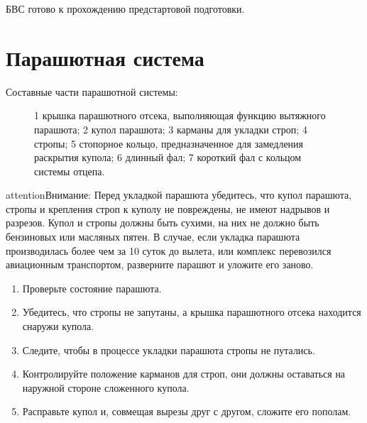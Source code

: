 \documentclass[a4paper,10pt,russian,openany]{sphinxmanual}
\let\sphinxpxdimen\pdfpxdimen\else\newdimen\sphinxpxdimen
\begin{document}
БВС готово к прохождению предстартовой подготовки.


\section{Парашютная система}
\label{\detokenize{uav:id4}}
Составные части парашютной системы:

\begin{figure}[H]
\centering
\capstart

\noindent\sphinxincludegraphics[width=350\sphinxpxdimen]{{para1}.png}
\caption{1 \textendash{} крышка парашютного отсека, выполняющая функцию вытяжного парашюта;
2 \textendash{} купол парашюта;
3 \textendash{} карманы для укладки строп;
4 \textendash{} стропы;
5 \textendash{} стопорное кольцо, предназначенное для замедления раскрытия купола;
6 \textendash{} длинный фал;
7 \textendash{} короткий фал с кольцом системы отцепа.}\label{\detokenize{uav:id13}}\end{figure}

\begin{sphinxadmonition}{attention}{Внимание:}
Перед укладкой парашюта убедитесь, что купол парашюта, стропы и крепления строп к куполу не повреждены, не имеют надрывов и разрезов. Купол и стропы должны быть сухими, на них не должно быть бензиновых или масляных пятен. В случае, если укладка парашюта производилась более чем за 10 суток до вылета, или комплекс перевозился авиационным транспортом, разверните парашют и уложите его заново.
\end{sphinxadmonition}

\begin{enumerate}
\def\theenumi{\arabic{enumi}}
\def\labelenumi{\theenumi )}
\makeatletter\def\p@enumii{\p@enumi \theenumi )}\makeatother
\item {} 
Проверьте состояние парашюта.

\item {} 
Убедитесь, что стропы не запутаны, а крышка парашютного отсека находится снаружи купола.

\item {} 
Следите, чтобы в процессе укладки парашюта стропы не путались.

\item {} 
Контролируйте положение карманов для строп, они должны оставаться на наружной стороне сложенного купола.

\item {} 
Расправьте купол и, совмещая вырезы друг с другом, сложите его пополам.

\end{enumerate}
\end{document}
